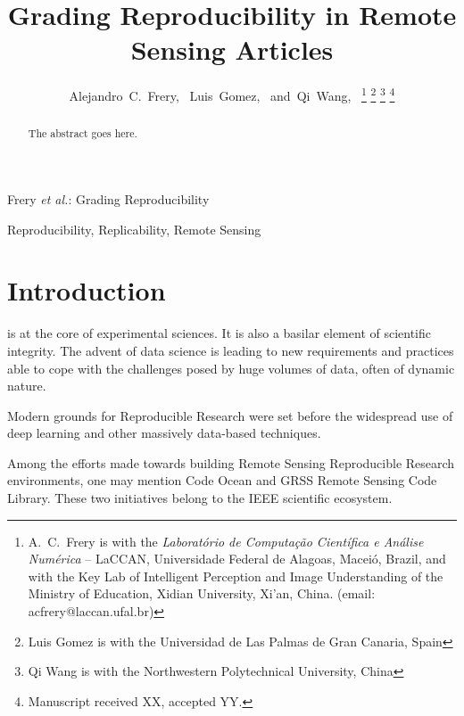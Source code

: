 \documentclass[journal]{IEEEtran}
\begin{document}
	
\title{Grading Reproducibility in Remote Sensing Articles}
	
\author{Alejandro~C.~Frery,~
Luis~Gomez,~
and~Qi~Wang,~%
\thanks{A.\ C.\ Frery is with the \textit{Laborat\'orio de Computa\c c\~ao Cient\'ifica e An\'alise Num\'erica} -- LaCCAN, Universidade Federal de Alagoas, Macei\'o, Brazil, and with the Key Lab of Intelligent Perception and Image Understanding of the Ministry of Education, Xidian University, Xi'an, China. (email: acfrery@laccan.ufal.br)}%
\thanks{Luis Gomez is with the Universidad de Las Palmas de Gran Canaria, Spain}%
\thanks{Qi Wang is with the Northwestern Polytechnical University, China}%
\thanks{Manuscript received XX, accepted YY.}}
	
%
{Frery \MakeLowercase{\textit{et al.}}: Grading Reproducibility}
	
\maketitle
	
\begin{abstract}
The abstract goes here.
\end{abstract}
	
\begin{IEEEkeywords}
Reproducibility,
Replicability,
Remote Sensing
\end{IEEEkeywords}
	

\IEEEpeerreviewmaketitle

\section{Introduction}
	
 is at the core of experimental sciences. 
It is also a basilar element of scientific integrity. 
The advent of data science is leading to new requirements and practices able to cope with the challenges posed by huge volumes of data, often of dynamic nature. 
	
Modern grounds for Reproducible Research were set before the widespread use of deep learning and other massively data-based techniques. 
	
Among the efforts made towards building Remote Sensing Reproducible Research environments, one may mention Code Ocean and GRSS Remote Sensing Code Library. 
These two initiatives belong to the IEEE scientific ecosystem. 
	
\end{document}
